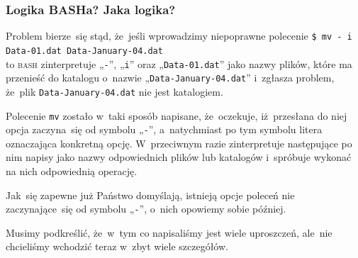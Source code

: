 \documentclass[10pt,t]{beamer}
\begin{document}
\begin{frame}
  \frametitle{Logika BASHa? Jaka logika?}


  Problem bierze~się stąd, że~jeśli wprowadzimy niepoprawne polecenie
  \texttt{\$ mv - i Data-01.dat Data-January-04.dat} \\
  to \textsc{bash} zinterpretuje „\texttt{-}”, „\texttt{i}” oraz
  „\texttt{Data-01.dat}” jako nazwy \alert{plików}, które ma przenieść
  do katalogu o~nazwie „\texttt{Data-January-04.dat}” i~zgłasza problem,
  że~plik \texttt{Data-January-04.dat} nie jest katalogiem.

  Polecenie \texttt{mv} zostało w~taki sposób napisane, że~oczekuje,
  iż~przesłana do niej opcja zaczyna~się od symbolu „\texttt{-}”,
  a~natychmiast po tym symbolu litera oznaczająca konkretną opcję.
  W~przeciwnym razie zinterpretuje następujące po nim napisy jako nazwy
  odpowiednich plików lub katalogów i~spróbuje wykonać na nich odpowiednią
  operację.

  Jak~się zapewne już Państwo domyślają, istnieją opcje poleceń nie
  zaczynające~się od symbolu „\texttt{-}”, o~nich opowiemy sobie później.

  Musimy podkreślić, że~w~tym co napisaliśmy jest wiele uproszczeń,
  ale~nie chcieliśmy wchodzić teraz w~zbyt wiele szczegółów.



\end{frame}
\end{document}
